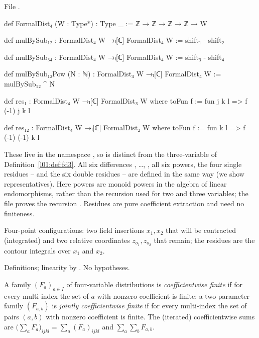 \noindent File .
\begin{leancode}
def FormalDist₄ (W : Type*) : Type _ := ℤ → ℤ → ℤ → ℤ → W

def mulBySub₁₂ : FormalDist₄ W →ₗ[ℂ] FormalDist₄ W := shift₁ - shift₂

def mulBySub₃₄ : FormalDist₄ W →ₗ[ℂ] FormalDist₄ W := shift₃ - shift₄

def mulBySub₁₂Pow (N : ℕ) : FormalDist₄ W →ₗ[ℂ] FormalDist₄ W := mulBySub₁₂ ^ N

def res₁ : FormalDist₄ W →ₗ[ℂ] FormalDist₃ W where
  toFun f := fun j k l => f (-1) j k l

def res₁₂ : FormalDist₄ W →ₗ[ℂ] FormalDist₂ W where
  toFun f := fun k l => f (-1) (-1) k l
\end{leancode}

\begin{dictionary}
These live in the namespace , so  is distinct from the three-variable
 of Definition~\ref{l01:def:fd3}. All six differences , \dots, , all six
powers, the four single residues -- and the six double residues -- are defined in the
same way (we show representatives). Here powers are monoid powers  in the algebra of linear
endomorphisms, rather than the recursion used for two and three variables; the file proves the recursion
. Residues are pure coefficient extraction and need no finiteness.
\end{dictionary}

\begin{physics}
Four-point configurations: two field insertions $x_1,x_2$ that will be contracted (integrated) and two relative
coordinates $z_{o_1},z_{o_2}$ that remain; the residues are the contour integrals over $x_1$ and $x_2$.
\end{physics}

\begin{status}
Definitions; linearity by . No hypotheses.
\end{status}

\begin{definition}\label{l01:def:coeffsum}
A family $(F_a)_{a\in I}$ of four-variable distributions is \emph{coefficientwise finite} if for every multi-index the set
of $a$ with nonzero coefficient is finite; a two-parameter family $(F_{a,b})$ is \emph{jointly coefficientwise finite} if
for every multi-index the set of pairs $(a,b)$ with nonzero coefficient is finite. The (iterated) coefficientwise sums
are $\big(\sum_aF_a\big)_{ijkl} = \sum_a(F_a)_{ijkl}$ and $\sum_a\sum_bF_{a,b}$.
\end{definition}

